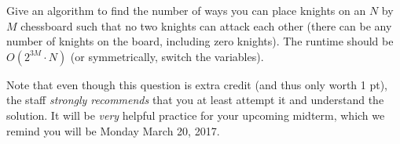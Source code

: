 \documentclass{article}\usepackage[utf8]{inputenc}\usepackage[margin=0.4cm,top=0.4cm,bottom=0.4cm]{geometry}
\begin{document}
\noindent Give an algorithm to find the number of ways you can place knights on an $N$ by $M$ chessboard such that no two knights can attack each other (there can be any number of knights on the board, including zero knights). The runtime should be $O(2^{3M}\cdot N)$ (or symmetrically, switch the variables).

\vspace{4pt}
\noindent Note that even though this question is extra credit (and thus only worth 1 pt), the staff {\it strongly recommends} that you at least attempt it and understand the solution. It will be {\it very} helpful practice for your upcoming midterm, which we remind you will be Monday March 20, 2017.

\BeginSolution %

\EndSolution
\clearpage
\end{document}
